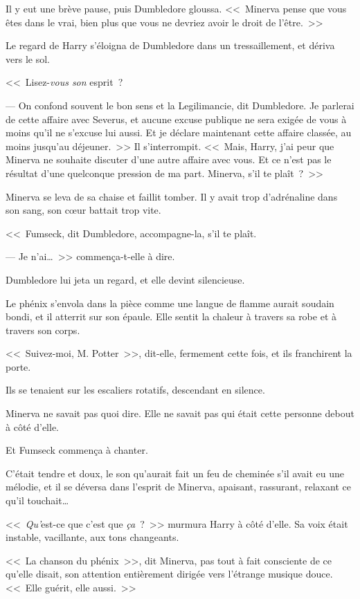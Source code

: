 Il y eut une brève pause, puis Dumbledore gloussa. <<~Minerva pense que vous êtes dans le vrai, bien plus que vous ne devriez avoir le droit de l'être.~>>

Le regard de Harry s'éloigna de Dumbledore dans un tressaillement, et dériva vers le sol.

<<~Lisez-\emph{vous son} esprit~?

--- On confond souvent le bon sens et la Legilimancie, dit Dumbledore. Je parlerai de cette affaire avec Severus, et aucune excuse publique ne sera exigée de vous à moins qu'il ne s'excuse lui aussi. Et je déclare maintenant cette affaire classée, au moins jusqu'au déjeuner.~>> Il s'interrompit. <<~Mais, Harry, j'ai peur que Minerva ne souhaite discuter d'une autre affaire avec vous. Et ce n'est pas le résultat d'une quelconque pression de ma part. Minerva, s'il te plaît~?~>>

Minerva se leva de sa chaise et faillit tomber. Il y avait trop d'adrénaline dans son sang, son cœur battait trop vite.

<<~Fumseck, dit Dumbledore, accompagne-la, s'il te plaît.

--- Je n'ai…~>> commença-t-elle à dire.

Dumbledore lui jeta un regard, et elle devint silencieuse.

Le phénix s'envola dans la pièce comme une langue de flamme aurait soudain bondi, et il atterrit sur son épaule. Elle sentit la chaleur à travers sa robe et à travers son corps.

<<~Suivez-moi, M. Potter~>>, dit-elle, fermement cette fois, et ils franchirent la porte.

\later

Ils se tenaient sur les escaliers rotatifs, descendant en silence.

Minerva ne savait pas quoi dire. Elle ne savait pas qui était cette personne debout à côté d'elle.

Et Fumseck commença à chanter.

C'était tendre et doux, le son qu'aurait fait un feu de cheminée s'il avait eu une mélodie, et il se déversa dans l'esprit de Minerva, apaisant, rassurant, relaxant ce qu'il touchait…

<<~\emph{Qu'}est-ce que c'est que \emph{ça}~?~>> murmura Harry à côté d'elle. Sa voix était instable, vacillante, aux tons changeants.

<<~La chanson du phénix~>>, dit Minerva, pas tout à fait consciente de ce qu'elle disait, son attention entièrement dirigée vers l'étrange musique douce. <<~Elle guérit, elle aussi.~>>

